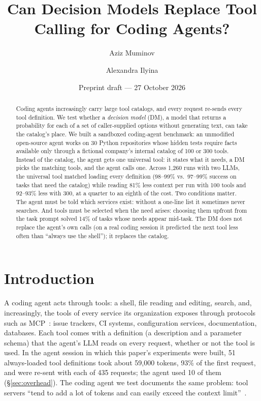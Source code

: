 \title{\textbf{Can Decision Models Replace Tool Calling for Coding Agents?}}
\author{Aziz Muminov \and Alexandra Ilyina}
\date{Preprint draft --- 27 October 2026}


\maketitle

\begin{abstract}
Coding agents increasingly carry large tool catalogs, and every request re-sends every tool definition. We
test whether a \emph{decision model} (DM), a model that returns a probability for each of a set of
caller-supplied options without generating text, can take the catalog's place. We built a sandboxed
coding-agent benchmark: an unmodified open-source agent works on 30 Python repositories whose hidden tests
require facts available only through a fictional company's internal catalog of 100 or 300 tools. Instead of
the catalog, the agent gets one universal tool: it states what it needs, a DM picks the matching tools, and the
agent calls one. Across 1{,}260 runs with two LLMs, the universal tool matched loading every definition
(98--99\% vs.\ 97--99\% success on tasks that need the catalog) while reading 81\% less context per run with
100 tools and 92--93\% less with 300, at a quarter to an eighth of the cost. Two conditions matter. The agent
must be told which services exist: without a one-line list it sometimes never searches. And tools must be
selected when the need arises: choosing them upfront from the task prompt solved 14\% of tasks whose needs
appear mid-task. The DM does not replace the agent's own calls (on a real coding session it predicted the next
tool less often than ``always use the shell''); it replaces the catalog.
\end{abstract}

\section{Introduction}\label{sec:intro}

A coding agent acts through tools: a shell, file reading and editing, search, and, increasingly, the tools of
every service its organization exposes through protocols such as MCP~\citep{mcp}: issue trackers, CI systems,
configuration services, documentation, databases. Each tool comes with a definition (a description and a
parameter schema) that the agent's LLM reads on every request, whether or not the tool is used. In the agent
session in which this paper's experiments were built, 51 always-loaded tool definitions took about
59{,}000 tokens, 93\% of the first request, and were re-sent with each of 435 requests; the agent used 10 of
them (\S\ref{sec:overhead}). The coding agent we test documents the same problem: tool servers ``tend to add a
lot of tokens and can easily exceed the context limit''~\citep{opencode}.

